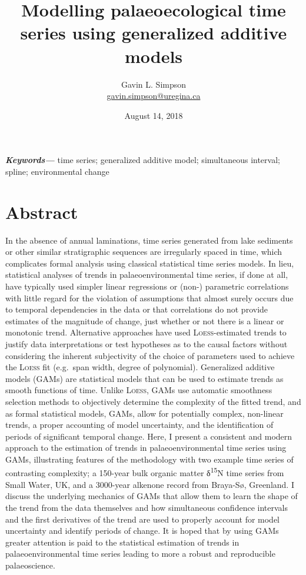 \documentclass[12pt,]{article}
\title{Modelling palaeoecological time series using generalized additive models}
\author[1]{Gavin L. Simpson\\ \href{mailto:gavin.simpson@uregina.ca}{gavin.simpson@uregina.ca}}
\affil[1]{Institute of Environmental Change and Society, ~University of Regina,
Regina, Saskatchewan, Canada, S4S 0A2}
\date{August 14, 2018}
\newcommand{\loess}{\textsc{Loess}}
\begin{document}
\maketitle

\newcommand*{\keywords}[1]{\textbf{\textit{Keywords---}} #1}
    \keywords{time series; generalized additive model; simultaneous interval; spline;
environmental change}

\makeatletter
\def\fps@figure{tbp}
\makeatother


\section*{Abstract}\label{abstract}

In the absence of annual laminations, time series generated from lake
sediments or other similar stratigraphic sequences are irregularly
spaced in time, which complicates formal analysis using classical
statistical time series models. In lieu, statistical analyses of trends
in palaeoenvironmental time series, if done at all, have typically used
simpler linear regressions or (non-) parametric correlations with little
regard for the violation of assumptions that almost surely occurs due to
temporal dependencies in the data or that correlations do not provide
estimates of the magnitude of change, just whether or not there is a
linear or monotonic trend. Alternative approaches have used
\loess{}-estimated trends to justify data interpretations or test
hypotheses as to the causal factors without considering the inherent
subjectivity of the choice of parameters used to achieve the \loess{}
fit (e.g.~span width, degree of polynomial). Generalized additive models
(GAMs) are statistical models that can be used to estimate trends as
smooth functions of time. Unlike \loess{}, GAMs use automatic smoothness
selection methods to objectively determine the complexity of the fitted
trend, and as formal statistical models, GAMs, allow for potentially
complex, non-linear trends, a proper accounting of model uncertainty,
and the identification of periods of significant temporal change. Here,
I present a consistent and modern approach to the estimation of trends
in palaeoenvironmental time series using GAMs, illustrating features of
the methodology with two example time series of contrasting complexity;
a 150-year bulk organic matter δ\textsuperscript{15}N time series from
Small Water, UK, and a 3000-year alkenone record from Braya-Sø,
Greenland. I discuss the underlying mechanics of GAMs that allow them to
learn the shape of the trend from the data themselves and how
simultaneous confidence intervals and the first derivatives of the trend
are used to properly account for model uncertainty and identify periods
of change. It is hoped that by using GAMs greater attention is paid to
the statistical estimation of trends in palaeoenvironmental time series
leading to more a robust and reproducible palaeoscience.
\end{document}
